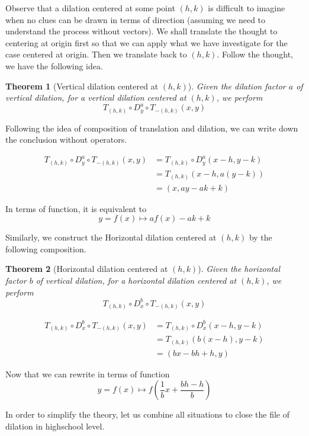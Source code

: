 \documentclass[12pt]{article}
\newtheorem*{theorem}{Theorem}
\begin{document}
    Observe that a dilation centered at some point $(h,k)$ is difficult to imagine when no clues can be drawn in terms of direction (assuming we need to understand the process without vectors). We shall translate the thought to centering at origin first so that we can apply what we have investigate for the case centered at origin. Then we translate back to $(h,k)$. Follow the thought, we have the following idea.

    \begin{theorem}[Vertical dilation centered at $(h,k)$]
        Given the dilation factor $a$ of vertical dilation, for a vertical dilation centered at $(h,k)$, we perform \[T_{(h,k)}\circ D_y^a \circ T_{-(h,k)}(x,y)\]
    \end{theorem}

    Following the idea of composition of translation and dilation, we can write down the conclusion without operators.
    
    \begin{align*}
        T_{(h,k)}\circ D_y^a \circ T_{-(h,k)}(x,y)&=T_{(h,k)}\circ D_y^a(x-h,y-k)\\
        &=T_{(h,k)}(x-h,a(y-k))\\
        &=(x,ay-ak+k)
    \end{align*}

    In terms of function, it is equivalent to \[y=f(x)\mapsto af(x)-ak+k\]

    Similarly, we construct the Horizontal dilation centered at $(h,k)$ by the following composition.

    \begin{theorem}[Horizontal dilation centered at $(h,k)$]
        Given the horizontal factor $b$ of vertical dilation, for a horizontal dilation centered at $(h,k)$, we perform \[T_{(h,k)}\circ D_x^b \circ T_{-(h,k)}(x,y)\]
    \end{theorem}

    \begin{align*}
        T_{(h,k)}\circ D_x^b \circ T_{-(h,k)}(x,y)&=T_{(h,k)}\circ D_x^b(x-h,y-k)\\
        &=T_{(h,k)}(b(x-h),y-k)\\
        &=(bx-bh+h,y)
    \end{align*}

    Now that we can rewrite in terms of function \[y=f(x)\mapsto f(\frac{1}{b}x+\frac{bh-h}{b})\]

    In order to simplify the theory, let us combine all situations to close the file of dilation in highschool level.
\end{document}

